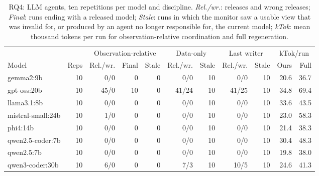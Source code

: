 \documentclass[pdflatex,sn-mathphys-num]{sn-jnl}
\theoremstyle{thmstyleone}%
\theoremstyle{thmstyletwo}%
\theoremstyle{thmstylethree}%
\begin{document}
\begin{table}[!ht]
\caption{RQ4: LLM agents, ten repetitions per model and discipline. \emph{Rel./wr.}: releases and wrong releases; \emph{Final}: runs ending with a released model; \emph{Stale}: runs in which the monitor saw a usable view that was invalid for, or produced by an agent no longer responsible for, the current model; \emph{kTok}: mean thousand tokens per run for observation-relative coordination and full regeneration.}\label{tab:llm}
\footnotesize\setlength{\tabcolsep}{2.5pt}
\begin{tabular}{@{}lrrrrrrrrrr@{}}\toprule
 & & \multicolumn{3}{c}{Observation-relative} & \multicolumn{2}{c}{Data-only} & \multicolumn{2}{c}{Last writer} & \multicolumn{2}{c}{kTok/run}\\\cmidrule(lr){3-5}\cmidrule(lr){6-7}\cmidrule(lr){8-9}\cmidrule(lr){10-11}
Model & Reps & Rel./wr. & Final & Stale & Rel./wr. & Stale & Rel./wr. & Stale & Ours & Full\\\midrule
gemma2:9b & 10 & 0/0 & 0 & 0 & 0/0 & 10 & 0/0 & 10 & 20.6 & 36.7 \\
gpt-oss:20b & 10 & 45/0 & 10 & 0 & 41/24 & 10 & 41/25 & 10 & 34.8 & 69.4 \\
llama3.1:8b & 10 & 0/0 & 0 & 0 & 0/0 & 10 & 0/0 & 10 & 33.6 & 43.5 \\
mistral-small:24b & 10 & 1/0 & 0 & 0 & 0/0 & 10 & 0/0 & 10 & 23.0 & 58.3 \\
phi4:14b & 10 & 0/0 & 0 & 0 & 0/0 & 10 & 0/0 & 10 & 21.4 & 38.3 \\
qwen2.5-coder:7b & 10 & 0/0 & 0 & 0 & 0/0 & 10 & 0/0 & 10 & 30.4 & 48.3 \\
qwen2.5:7b & 10 & 0/0 & 0 & 0 & 0/0 & 10 & 0/0 & 10 & 19.8 & 38.0 \\
qwen3-coder:30b & 10 & 6/0 & 0 & 0 & 7/3 & 10 & 10/5 & 10 & 24.6 & 41.3 \\
\bottomrule
\end{tabular}
\end{table}
\end{document}
